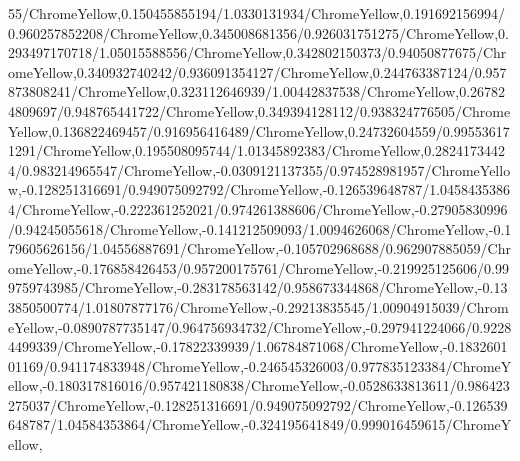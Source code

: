 {\begin{tikzternal}
{55/ChromeYellow,0.150455855194/1.0330131934/ChromeYellow,0.191692156994/0.960257852208/ChromeYellow,0.345008681356/0.926031751275/ChromeYellow,0.293497170718/1.05015588556/ChromeYellow,0.342802150373/0.94050877675/ChromeYellow,0.340932740242/0.936091354127/ChromeYellow,0.244763387124/0.957873808241/ChromeYellow,0.323112646939/1.00442837538/ChromeYellow,0.267824809697/0.948765441722/ChromeYellow,0.349394128112/0.938324776505/ChromeYellow,0.136822469457/0.916956416489/ChromeYellow,0.24732604559/0.995536171291/ChromeYellow,0.195508095744/1.01345892383/ChromeYellow,0.28241734424/0.983214965547/ChromeYellow,-0.0309121137355/0.974528981957/ChromeYellow,-0.128251316691/0.949075092792/ChromeYellow,-0.126539648787/1.04584353864/ChromeYellow,-0.222361252021/0.974261388606/ChromeYellow,-0.27905830996/0.94245055618/ChromeYellow,-0.141212509093/1.0094626068/ChromeYellow,-0.179605626156/1.04556887691/ChromeYellow,-0.105702968688/0.962907885059/ChromeYellow,-0.176858426453/0.957200175761/ChromeYellow,-0.219925125606/0.999759743985/ChromeYellow,-0.283178563142/0.958673344868/ChromeYellow,-0.133850500774/1.01807877176/ChromeYellow,-0.29213835545/1.00904915039/ChromeYellow,-0.0890787735147/0.964756934732/ChromeYellow,-0.297941224066/0.92284499339/ChromeYellow,-0.17822339939/1.06784871068/ChromeYellow,-0.183260101169/0.941174833948/ChromeYellow,-0.246545326003/0.977835123384/ChromeYellow,-0.180317816016/0.957421180838/ChromeYellow,-0.0528633813611/0.986423275037/ChromeYellow,-0.128251316691/0.949075092792/ChromeYellow,-0.126539648787/1.04584353864/ChromeYellow,-0.324195641849/0.999016459615/ChromeYellow,
}
\end{tikzternal}}
